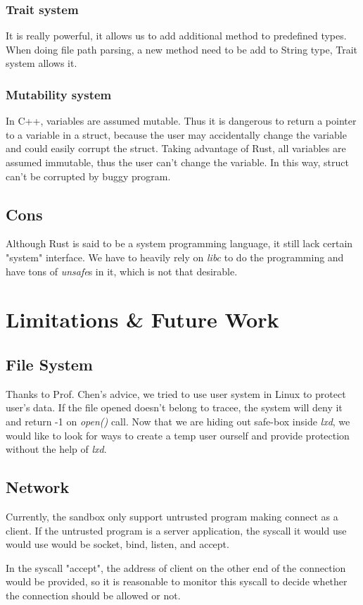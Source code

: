 \documentclass[conference,compsoc]{IEEEtran}
\begin{document}
			\subsubsection{Trait system} 
				It is really powerful, it allows us to add additional method to predefined types. 
				When doing file path parsing, a new method need to be add to String type, Trait system allows it.
			\subsubsection{Mutability system} 
				In C++, variables are assumed mutable. 
				Thus it is dangerous to return a pointer to a variable in a struct, because the user may accidentally change the variable and could easily corrupt the struct.
				Taking advantage of Rust, all variables are assumed immutable, thus the user can't change the variable. 
				In this way, struct can't be corrupted by buggy program.
	\subsection{Cons}
		\par
			Although Rust is said to be a system programming language, it still lack certain "system" interface.
			We have to heavily rely on \emph{libc} to do the programming and have tons of \emph{unsafe}s in it, which is not that desirable. 				

\section{Limitations \& Future Work}
	\subsection{File System}
		\par
			Thanks to Prof. Chen's advice, we tried to use user system in Linux to protect user's data. 
			If the file opened doesn't belong to tracee, the system will deny it and return -1 on \emph{open()} call.
			Now that we are hiding out safe-box inside \emph{lxd}, we would like to look for ways to create a temp user ourself and provide protection without the help of \emph{lxd}.
	\subsection{Network}
		\par
			Currently, the sandbox only support untrusted program making connect as a client. 
			If the untrusted program is a server application, the syscall it would use would use would be socket, bind, listen, and accept. 
		\par
			In the syscall "accept", the address of client on the other end of the connection would be provided, so it is reasonable to monitor this syscall to decide whether the connection should be allowed or not.
\end{document}
